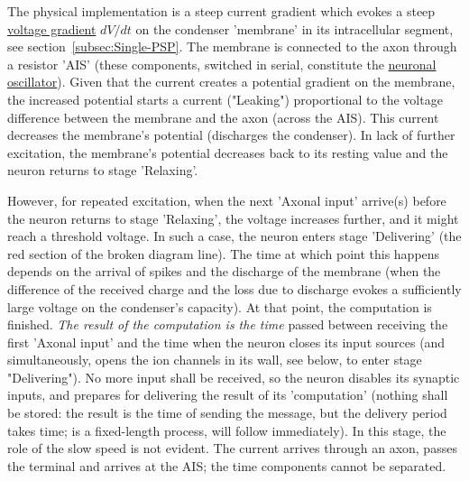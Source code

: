 The physical implementation is
a steep current gradient which evokes a steep \hyperlink{voltage_gradient}{voltage gradient} $dV/dt$
on the condenser 'membrane' in its intracellular segment, see section~\ref{subsec:Single-PSP}. 
The membrane is connected to the axon through a resistor 
'AIS'
(these components, switched in serial, constitute the \hyperlink{PhysicsOscillator}{neuronal oscillator}).
Given that the current creates a potential gradient on the membrane, the 
increased potential starts a current ("Leaking") proportional to the voltage difference
between the membrane and the axon (across the AIS). This current decreases
the membrane's potential (discharges the condenser). In lack of further 
excitation, the membrane's potential decreases back to its resting value
and the neuron returns to stage 'Relaxing'.

\fi

\ifx\magyar\undefined

%
However, for repeated excitation, when the next 'Axonal input' arrive(s) before
the neuron returns to stage 'Relaxing', the voltage increases further, and it might reach
a threshold voltage. In such a case, the neuron enters stage 'Delivering'
(the red section of the broken diagram line). The time at which point this happens
depends on the arrival of spikes and the discharge of the membrane (when the
difference of the received charge and the loss due to discharge evokes
a sufficiently large voltage on the condenser's capacity). At that point,
the computation is finished. \textit{The result of the computation is
the time} passed between receiving the first 'Axonal input' and the time when
the neuron closes its input sources (and simultaneously, opens the ion channels
in its wall, see below, to enter stage "Delivering").  No more input shall be received, so
the neuron disables its synaptic inputs, and prepares for delivering 
the result of its 'computation' (nothing shall be stored: the result is the time of sending the message, but the delivery period takes time; is a fixed-length
process, will follow immediately). 
In this stage, the role of the slow speed is not evident. The current 
arrives through an axon, passes the terminal and arrives at the AIS;
the time components cannot be separated. 

\else

